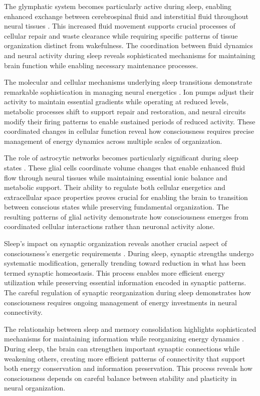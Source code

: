 The glymphatic system becomes particularly active during sleep, enabling enhanced exchange between cerebrospinal fluid and interstitial fluid throughout neural tissues \cite{Nedergaard2020}. This increased fluid movement supports crucial processes of cellular repair and waste clearance while requiring specific patterns of tissue organization distinct from wakefulness. The coordination between fluid dynamics and neural activity during sleep reveals sophisticated mechanisms for maintaining brain function while enabling necessary maintenance processes.

The molecular and cellular mechanisms underlying sleep transitions demonstrate remarkable sophistication in managing neural energetics \cite{Holst2018}. Ion pumps adjust their activity to maintain essential gradients while operating at reduced levels, metabolic processes shift to support repair and restoration, and neural circuits modify their firing patterns to enable sustained periods of reduced activity. These coordinated changes in cellular function reveal how consciousness requires precise management of energy dynamics across multiple scales of organization.

The role of astrocytic networks becomes particularly significant during sleep states \cite{Krueger2016}. These glial cells coordinate volume changes that enable enhanced fluid flow through neural tissues while maintaining essential ionic balance and metabolic support. Their ability to regulate both cellular energetics and extracellular space properties proves crucial for enabling the brain to transition between conscious states while preserving fundamental organization. The resulting patterns of glial activity demonstrate how consciousness emerges from coordinated cellular interactions rather than neuronal activity alone.

Sleep's impact on synaptic organization reveals another crucial aspect of consciousness's energetic requirements \cite{Cirelli2015}. During sleep, synaptic strengths undergo systematic modification, generally trending toward reduction in what has been termed synaptic homeostasis. This process enables more efficient energy utilization while preserving essential information encoded in synaptic patterns. The careful regulation of synaptic reorganization during sleep demonstrates how consciousness requires ongoing management of energy investments in neural connectivity.

The relationship between sleep and memory consolidation highlights sophisticated mechanisms for maintaining information while reorganizing energy dynamics \cite{Rasch2013}. During sleep, the brain can strengthen important synaptic connections while weakening others, creating more efficient patterns of connectivity that support both energy conservation and information preservation. This process reveals how consciousness depends on careful balance between stability and plasticity in neural organization.

